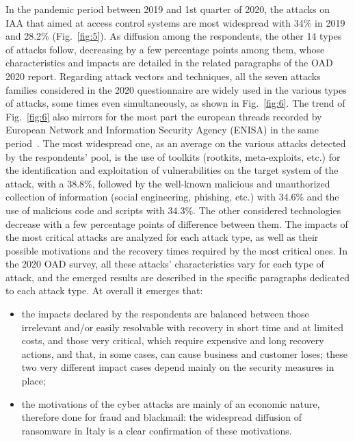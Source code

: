 \documentclass{easychair}
\begin{document}
In the pandemic period between 2019 and 1st quarter of 2020, the attacks on IAA that aimed at access control systems are most widespread with 34\% in 2019 and 28.2\% (Fig.~\ref{fig:5}).
As diffusion among the respondents, the other 14 types of attacks follow, decreasing by a few percentage points among them, whose characteristics and impacts are detailed in the related 
paragraphs of the OAD 2020 report. Regarding attack vectors and techniques, all the seven attacks families considered in the 2020 questionnaire are widely used in the various 
types of attacks, some times even simultaneously, as shown in Fig.~\ref{fig:6}. The trend of Fig.~\ref{fig:6} also mirrors for the most part the european threads recorded by European Network and Information Security Agency (ENISA) 
in the same period~\cite{enisa20}. The most widespread one, as an average on the various attacks detected by the respondents’ pool, is the use of toolkits (rootkits, meta-exploits, etc.) for the identification and exploitation of vulnerabilities
on the target system of the attack, with a 38.8\%, followed by the well-known malicious and unauthorized collection of information (social engineering, phishing, etc.) with 34.6\% 
and the use of malicious code and scripts with 34.3\%. The other considered technologies decrease with a few percentage points of difference between them. The impacts of the most 
critical attacks are analyzed for each attack type, as well as their possible motivations and the recovery times required by the most critical ones.
In the 2020 OAD survey, all these attacks’ characteristics vary for each type of attack, and the emerged results are described in the specific paragraphs dedicated to each attack 
type. At overall it emerges that:
\begin{itemize}
\item the impacts declared by the respondents are balanced between those irrelevant and/or easily resolvable with recovery in short time and at limited costs, and those very 
critical, which require expensive and long recovery actions, and that, in some cases, can cause business and customer loses; these two very different impact cases depend mainly 
on the security measures in place;

\item the motivations of the cyber attacks are mainly of an economic nature, therefore done for fraud and blackmail: the widespread diffusion of ransomware in Italy is a clear 
confirmation of these motivations.
\end{itemize}
\end{document}
